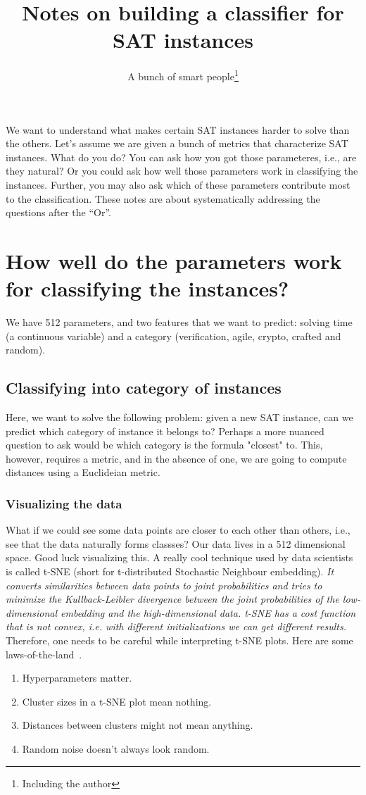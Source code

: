 \documentclass[10pt]{article}
\title{Notes on building a classifier for SAT instances}
\author{A bunch of smart people{\footnote{Including the author}}}
\begin{document}
\maketitle
We want to understand what makes certain SAT instances harder to solve than the
others. Let's assume we are given a bunch of metrics that characterize SAT
instances. What do you do? You can ask how you got those parameteres, i.e., are
they natural? Or you could ask how well those parameters work in classifying
the instances. Further, you may also ask which of these parameters contribute
most to the classification. These notes are about systematically addressing the questions
after the ``Or''.

\section{How well do the parameters work for classifying the instances?}
We have 512 parameters, and two features that we want to predict: solving time
(a continuous variable) and a category (verification, agile, crypto, crafted
and random).

\subsection{Classifying into category of instances}
Here, we want to solve the following problem: given a new SAT instance, can we
predict which category of instance it belongs to? Perhaps a more nuanced
question to ask would be which category is the formula "closest" to. This,
however, requires a metric, and in the absence of one, we are going to compute
distances using a Euclideian metric.    

\subsubsection{Visualizing the data}
What if we could see some data points are closer to each other than others,
i.e., see that the data naturally forms classses?  Our data lives in a 512
dimensional space. Good luck visualizing this. A really cool technique used by
data scientists is called t-SNE (short for t-distributed Stochastic Neighbour embedding). 
\textit{It converts similarities between data points to joint probabilities and
tries to minimize the Kullback-Leibler divergence between the joint
probabilities of the low-dimensional embedding and the high-dimensional data.
t-SNE has a cost function that is not convex, i.e. with different
initializations we can get different results.} Therefore, one needs to be careful while
interpreting t-SNE plots. Here are some laws-of-the-land~\cite{wattenberg2016how}.
\begin{enumerate}
    \item Hyperparameters matter. 
    \item Cluster sizes in a t-SNE plot mean nothing. 
    \item Distances between clusters might not mean anything.
    \item Random noise doesn’t always look random. 
\end{enumerate}
\end{document}
